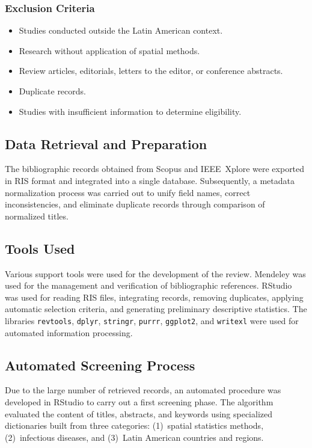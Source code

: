 \documentclass[conference]{IEEEtran}
\begin{document}
\subsubsection{Exclusion Criteria}
\begin{itemize}
  \item Studies conducted outside the Latin American context.
  \item Research without application of spatial methods.
  \item Review articles, editorials, letters to the editor,
    or conference abstracts.
  \item Duplicate records.
  \item Studies with insufficient information to determine
    eligibility.
\end{itemize}

\subsection{Data Retrieval and Preparation}

The bibliographic records obtained from Scopus and
IEEE~Xplore were exported in RIS format and integrated into
a single database. Subsequently, a metadata normalization
process was carried out to unify field names, correct
inconsistencies, and eliminate duplicate records through
comparison of normalized titles.

\subsection{Tools Used}

Various support tools were used for the development of the
review. Mendeley was used for the management and verification
of bibliographic references. RStudio was used for reading RIS
files, integrating records, removing duplicates, applying
automatic selection criteria, and generating preliminary
descriptive statistics. The libraries \texttt{revtools},
\texttt{dplyr}, \texttt{stringr}, \texttt{purrr},
\texttt{ggplot2}, and \texttt{writexl} were used for
automated information processing.

\subsection{Automated Screening Process}

Due to the large number of retrieved records, an automated
procedure was developed in RStudio to carry out a first
screening phase. The algorithm evaluated the content of
titles, abstracts, and keywords using specialized
dictionaries built from three categories: (1)~spatial
statistics methods, (2)~infectious diseases, and
(3)~Latin American countries and regions.
\end{document}
